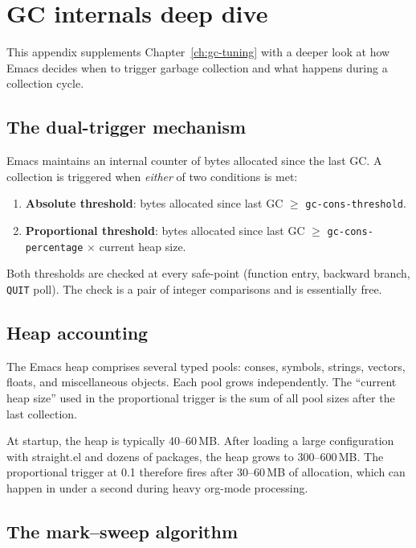 \chapter{GC internals deep dive}
\label{app:gc-internals}

This appendix supplements Chapter~\ref{ch:gc-tuning} with a deeper
look at how Emacs decides when to trigger garbage collection and what
happens during a collection cycle.

\section{The dual-trigger mechanism}

Emacs maintains an internal counter of bytes allocated since the last
GC.  A collection is triggered when \emph{either} of two conditions
is met:

\begin{enumerate}
  \item \textbf{Absolute threshold}: bytes allocated since last GC $\geq$ \texttt{gc-cons-threshold}.
  \item \textbf{Proportional threshold}: bytes allocated since last GC $\geq$ \texttt{gc-cons-percentage} $\times$ current heap size.
\end{enumerate}

Both thresholds are checked at every safe-point (function entry,
backward branch, \texttt{QUIT} poll).  The check is a pair of integer
comparisons and is essentially free.

\section{Heap accounting}

The Emacs heap comprises several typed pools: conses, symbols,
strings, vectors, floats, and miscellaneous objects.  Each pool
grows independently.  The ``current heap size'' used in the
proportional trigger is the sum of all pool sizes after the last
collection.

At startup, the heap is typically 40--60\,MB.  After loading a
large configuration with straight.el and dozens of packages,
the heap grows to 300--600\,MB.  The proportional trigger at
0.1 therefore fires after 30--60\,MB of allocation, which can
happen in under a second during heavy org-mode processing.

\section{The mark--sweep algorithm}

